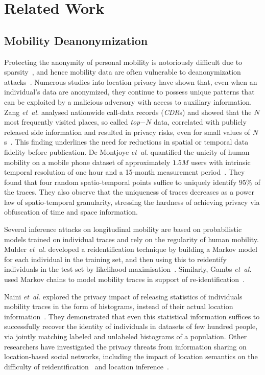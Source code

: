 \section{Related Work}


\subsection{Mobility Deanonymization}

Protecting the anonymity of personal mobility is notoriously difficult due to sparsity~\citep{aggarwal2008}, and hence mobility data are often vulnerable to deanonymization attacks~\citep{Narayanan2008}.
Numerous studies into location privacy have shown that, even when an individual's data are anonymized, they continue to possess unique patterns that can be exploited by a malicious adversary with access to auxiliary information.
Zang \emph{et~al.} analysed nationwide call-data records (\emph{CDR}s) and showed that the $N$ most frequently visited places, so called \emph{top$-N$} data, correlated with publicly released side information and resulted in privacy risks, even for small values of $N$s~\citep{Zang2011}.
This finding underlines the need for reductions in spatial or temporal data fidelity before publication.
De Montjoye \emph{et~al.} quantified the unicity of human mobility on a mobile phone dataset of approximately $1.5M$ users with intrinsic temporal resolution of one hour and a 15-month measurement period~\citep{DeMontjoye2013}.
They found that four random spatio-temporal points suffice to uniquely identify $ 95\% $ of the traces.
They also observe that the uniqueness of traces decreases as a power law of spatio-temporal granularity, stressing the hardness of achieving privacy via obfuscation of time and space information.

Several inference attacks on longitudinal mobility are based on probabilistic models trained on individual traces and rely on the regularity of human mobility.
Mulder \emph{et~al.} developed a reidentification technique by building a Markov model for each individual in the training set, and then using this to reidentify individuals in the test set by likelihood maximisation~\cite{deMulder08}.
Similarly, Gambs \emph{et~al.} used Markov chains to model mobility traces in support of re-identification~\cite{Gambs2014}.

Naini \emph{et~al.} explored the privacy impact of releasing statistics of individuals mobility traces in the form of histograms, instead of their actual location information~\cite{Naini2016a}. They demonstrated that even this statistical information suffices to successfully recover the identity of individuals in datasets of few hundred people, via jointly matching labeled and unlabeled histograms of a population.
Other researchers have investigated the privacy threats from information sharing on location-based social networks, including the impact of location semantics on the difficulty of reidentification~\cite{privacyAndTheCity} and location inference~\cite{Agir}.

